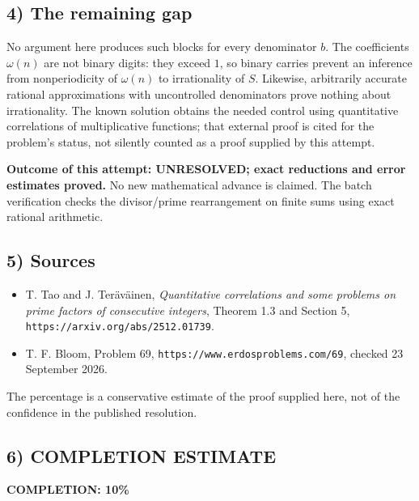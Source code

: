 \subsection{4) The remaining gap}
No argument here produces such blocks for every denominator $b$.
The coefficients $\omega(n)$ are not binary digits: they exceed $1$,
so binary carries prevent an inference from nonperiodicity of
$\omega(n)$ to irrationality of $S$. Likewise, arbitrarily accurate
rational approximations with uncontrolled denominators prove nothing
about irrationality. The known solution obtains the needed control
using quantitative correlations of multiplicative functions; that
external proof is cited for the problem's status, not silently counted
as a proof supplied by this attempt.

\textbf{Outcome of this attempt: UNRESOLVED; exact reductions and
error estimates proved.} No new mathematical advance is claimed.
The batch verification checks the divisor/prime rearrangement on
finite sums using exact rational arithmetic.

\subsection{5) Sources}
\begin{itemize}
\item T. Tao and J. Ter\"av\"ainen, \emph{Quantitative correlations
and some problems on prime factors of consecutive integers}, Theorem
1.3 and Section 5,
\texttt{https://arxiv.org/abs/2512.01739}.
\item T. F. Bloom, Problem 69,
\texttt{https://www.erdosproblems.com/69}, checked 23 September 2026.
\end{itemize}
The percentage is a conservative estimate of the proof supplied here,
not of the confidence in the published resolution.
\subsection{6) COMPLETION ESTIMATE}
\textbf{COMPLETION: 10\%}
